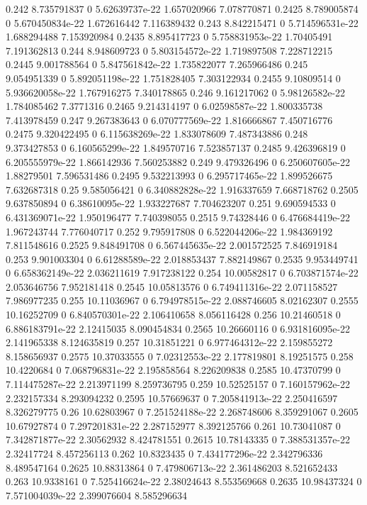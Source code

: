 {0.242 8.735791837 0 5.62639737e-22 1.657020966 7.078770871
0.2425 8.789005874 0 5.670450834e-22 1.672616442 7.116389432
0.243 8.842215471 0 5.714596531e-22 1.688294488 7.153920984
0.2435 8.895417723 0 5.758831953e-22 1.70405491 7.191362813
0.244 8.948609723 0 5.803154572e-22 1.719897508 7.228712215
0.2445 9.001788564 0 5.847561842e-22 1.735822077 7.265966486
0.245 9.054951339 0 5.892051198e-22 1.751828405 7.303122934
0.2455 9.10809514 0 5.936620058e-22 1.767916275 7.340178865
0.246 9.161217062 0 5.98126582e-22 1.784085462 7.3771316
0.2465 9.214314197 0 6.02598587e-22 1.800335738 7.413978459
0.247 9.267383643 0 6.070777569e-22 1.816666867 7.450716776
0.2475 9.320422495 0 6.115638269e-22 1.833078609 7.487343886
0.248 9.373427853 0 6.160565299e-22 1.849570716 7.523857137
0.2485 9.426396819 0 6.205555979e-22 1.866142936 7.560253882
0.249 9.479326496 0 6.250607605e-22 1.88279501 7.596531486
0.2495 9.532213993 0 6.295717465e-22 1.899526675 7.632687318
0.25 9.585056421 0 6.340882828e-22 1.916337659 7.668718762
0.2505 9.637850894 0 6.38610095e-22 1.933227687 7.704623207
0.251 9.690594533 0 6.431369071e-22 1.950196477 7.740398055
0.2515 9.74328446 0 6.476684419e-22 1.967243744 7.776040717
0.252 9.795917808 0 6.522044206e-22 1.984369192 7.811548616
0.2525 9.848491708 0 6.567445635e-22 2.001572525 7.846919184
0.253 9.901003304 0 6.61288589e-22 2.018853437 7.882149867
0.2535 9.953449741 0 6.658362149e-22 2.036211619 7.917238122
0.254 10.00582817 0 6.703871574e-22 2.053646756 7.952181418
0.2545 10.05813576 0 6.749411316e-22 2.071158527 7.986977235
0.255 10.11036967 0 6.794978515e-22 2.088746605 8.02162307
0.2555 10.16252709 0 6.840570301e-22 2.106410658 8.056116428
0.256 10.21460518 0 6.886183791e-22 2.12415035 8.090454834
0.2565 10.26660116 0 6.931816095e-22 2.141965338 8.124635819
0.257 10.31851221 0 6.977464312e-22 2.159855272 8.158656937
0.2575 10.37033555 0 7.02312553e-22 2.177819801 8.19251575
0.258 10.4220684 0 7.068796831e-22 2.195858564 8.226209838
0.2585 10.47370799 0 7.114475287e-22 2.213971199 8.259736795
0.259 10.52525157 0 7.160157962e-22 2.232157334 8.293094232
0.2595 10.57669637 0 7.205841913e-22 2.250416597 8.326279775
0.26 10.62803967 0 7.251524188e-22 2.268748606 8.359291067
0.2605 10.67927874 0 7.297201831e-22 2.287152977 8.392125766
0.261 10.73041087 0 7.342871877e-22 2.30562932 8.424781551
0.2615 10.78143335 0 7.388531357e-22 2.32417724 8.457256113
0.262 10.8323435 0 7.434177296e-22 2.342796336 8.489547164
0.2625 10.88313864 0 7.479806713e-22 2.361486203 8.521652433
0.263 10.9338161 0 7.525416624e-22 2.38024643 8.553569668
0.2635 10.98437324 0 7.571004039e-22 2.399076604 8.585296634
}
